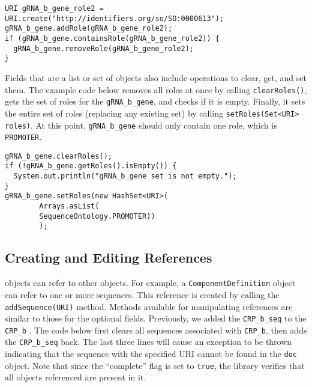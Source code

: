 \vspace{\abovedisplayskip}
\begin{minipage}{0.95\textwidth} 
\begin{lstlisting}
URI gRNA_b_gene_role2 = URI.create("http://identifiers.org/so/SO:0000613"); 
gRNA_b_gene.addRole(gRNA_b_gene_role2);
if (gRNA_b_gene.containsRole(gRNA_b_gene_role2)) {
  gRNA_b_gene.removeRole(gRNA_b_gene_role2);
}
\end{lstlisting}
\end{minipage}

Fields that are a list or set of objects also include operations to clear, get, and set them.  The example code below removes all roles at once by calling \lstinline+clearRoles()+, gets the set of roles for the \lstinline+gRNA_b_gene+, and checks if it is empty.   Finally, it sets the entire set of roles (replacing any existing set) by calling \lstinline+setRoles(Set<URI> roles)+. At this point, \lstinline+gRNA_b_gene+ should only contain one role, which is \lstinline+PROMOTER+.

\vspace{\abovedisplayskip}
\begin{minipage}{0.95\textwidth} 
\begin{lstlisting}
gRNA_b_gene.clearRoles();
if (!gRNA_b_gene.getRoles().isEmpty()) {
  System.out.println("gRNA_b_gene set is not empty.");
}
gRNA_b_gene.setRoles(new HashSet<URI>(
        Arrays.asList(
        SequenceOntology.PROMOTER))
        );
 \end{lstlisting}
\end{minipage}

\subsection*{Creating and Editing References}
 objects can refer to other  objects.  For example, 
a \lstinline+ComponentDefinition+ object can refer to one or more sequences.  This reference is created by calling the \lstinline+addSequence(URI)+ method.  Methods available for manipulating references are similar to those for the optional fields. Previously, we added the \lstinline+CRP_b_seq+  to the \lstinline+CRP_b+ . The code below first clears all sequences associated with \lstinline+CRP_b+,  then adds the \lstinline+CRP_b_seq+  back. The last three lines will cause an exception to be thrown indicating that the sequence with the specified URI cannot be found in the \lstinline+doc+  object. Note that since the ``complete'' flag is set to \lstinline+true+, the library verifies that all objects referenced are present in it.


